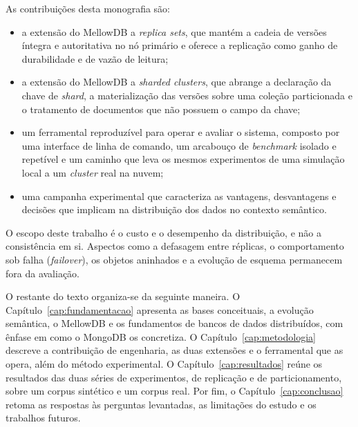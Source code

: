 As contribuições desta monografia são:
\begin{itemize}
  \item a extensão do MellowDB a \textit{replica sets}, que mantém a cadeia de versões íntegra e autoritativa no nó primário e oferece a replicação como ganho de durabilidade e de vazão de leitura;
  \item a extensão do MellowDB a \textit{sharded clusters}, que abrange a declaração da chave de \textit{shard}, a materialização das versões sobre uma coleção particionada e o tratamento de documentos que não possuem o campo da chave;
  \item um ferramental reproduzível para operar e avaliar o sistema, composto por uma interface de linha de comando, um arcabouço de \textit{benchmark} isolado e repetível e um caminho que leva os mesmos experimentos de uma simulação local a um \textit{cluster} real na nuvem;
  \item uma campanha experimental que caracteriza as vantagens, desvantagens e decisões que implicam na distribuição dos dados no contexto semântico.
\end{itemize}

O escopo deste trabalho é o custo e o desempenho da distribuição, e não a consistência em si. Aspectos como a defasagem entre réplicas, o comportamento sob falha (\textit{failover}), os objetos aninhados e a evolução de esquema permanecem fora da avaliação.

O restante do texto organiza-se da seguinte maneira. O Capítulo~\ref{cap:fundamentacao} apresenta as bases conceituais, a evolução semântica, o MellowDB e os fundamentos de bancos de dados distribuídos, com ênfase em como o MongoDB os concretiza. O Capítulo~\ref{cap:metodologia} descreve a contribuição de engenharia, as duas extensões e o ferramental que as opera, além do método experimental. O Capítulo~\ref{cap:resultados} reúne os resultados das duas séries de experimentos, de replicação e de particionamento, sobre um corpus sintético e um corpus real. Por fim, o Capítulo~\ref{cap:conclusao} retoma as respostas às perguntas levantadas, as limitações do estudo e os trabalhos futuros.
